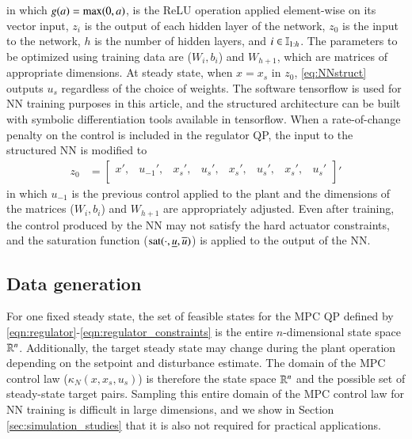 \documentclass[preprint,5p, twocolumn, authoryear]{elsarticle}
\begin{document}
in which $g(a) = \textnormal{max} (0, a)$, is the ReLU operation applied
element-wise on its vector input, $z_i$ is the output of each hidden layer of
the network, $z_0$ is the input to the network, $h$ is the number of hidden
layers, and $i \in \mathbb{I}_{1:h}$. The parameters to be optimized using training
data are ($W_i, b_i$) and $W_{h+1}$, which are matrices of appropriate
dimensions. At steady state, when $x=x_s$ in $z_0$, \eqref{eq:NNstruct} outputs
$u_s$ regardless of the choice of weights. The software tensorflow
\citep{abadi:agarwal:barham:brevdo:et-al:2015} is used for NN training purposes
in this article, and the structured architecture can be built with symbolic
differentiation tools available in tensorflow. When a rate-of-change penalty on
the control is included in the regulator QP, the input to the structured NN is
modified to 
\begin{align*}
    z_0 &= 
    \begin{bmatrix}
    x', & u_{-1}', & x_s', & u_s', & x_s', & u_s', & x_s', & u_s' \\
    \end{bmatrix}'
\end{align*}
in which $u_{-1}$ is the previous control applied to the plant and the
dimensions of the matrices ($W_i, b_i$) and $W_{h+1}$ are appropriately
adjusted. Even after training, the control produced by the NN may not satisfy
the hard actuator constraints, and the saturation function
($\textnormal{sat}(\cdot, \underline{u}, \overline{u})$) is applied to the
output of the NN.

\subsection{Data generation}

For one fixed steady state, the set of feasible states for the MPC QP defined by
\eqref{eqn:regulator}-\eqref{eqn:regulator_constraints} is the entire
$n$-dimensional state space $\mathbb{R}^n$. Additionally, the target steady state may
change during the plant operation depending on the setpoint and disturbance
estimate. The domain of the MPC control law ($\kappa_N(x, x_s, u_s)$) is
therefore the state space $\mathbb{R}^{n}$ and the possible set of steady-state target
pairs. Sampling this entire domain of the MPC control law for NN training is
difficult in large dimensions, and we show in Section
\ref{sec:simulation_studies} that it is also not required for practical
applications. 
\end{document}
